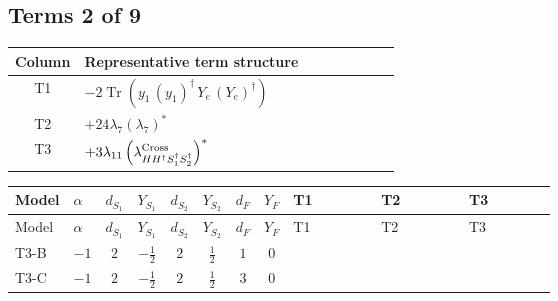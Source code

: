 \documentclass[8pt]{article}
\begin{document}
\begin{landscape}
\subsection*{Terms 2 of 9}
\begin{center}
\begin{tabular}{@{}c >{\raggedright\arraybackslash}p{0.82\linewidth}@{}}
\toprule
Column & Representative term structure \\
\midrule
T1 & \(\displaystyle -2 \operatorname{Tr}\!\left({y_1}\,\left({y_1}\right)^{\dagger}\,{Y_e}\,\left({Y_e}\right)^{\dagger}\right)\) \\
\midrule
T2 & \(\displaystyle +24 {\lambda_{7}} \left({\lambda_{7}}\right)^{*}\) \\
\midrule
T3 & \(\displaystyle +3 {\lambda_{11}} \left({\lambda_{H H^\dagger S_1^\dagger S_2^\dagger}^{\rm Cross}}\right)^{*}\) \\
\midrule
\bottomrule
\end{tabular}
\end{center}
\smallskip
\tiny
\begin{longtable}{@{}llcccccc >{\raggedright\arraybackslash}p{0.21\linewidth} >{\raggedright\arraybackslash}p{0.21\linewidth} >{\raggedright\arraybackslash}p{0.21\linewidth}@{}}
\toprule
Model & $\alpha$ & $d_{S_1}$ & $Y_{S_1}$ & $d_{S_2}$ & $Y_{S_2}$ & $d_F$ & $Y_F$ & T1 & T2 & T3 \\
\midrule
\endfirsthead
\toprule
Model & $\alpha$ & $d_{S_1}$ & $Y_{S_1}$ & $d_{S_2}$ & $Y_{S_2}$ & $d_F$ & $Y_F$ & T1 & T2 & T3 \\
\midrule
\endhead
T3-B & $-1$ & $2$ & $-\frac{1}{2}$ & $2$ & $\frac{1}{2}$ & $1$ & $0$ & \scriptsize\adjustbox{max width=\linewidth}{$\begin{gathered} -2 \operatorname{Tr}\!\left({y_1}\,\left({y_1}\right)^{\dagger}\,{Y_e}\,\left({Y_e}\right)^{\dagger}\right)\end{gathered}$} & \scriptsize\adjustbox{max width=\linewidth}{$\begin{gathered} +24 {\lambda_{7}} \left({\lambda_{7}}\right)^{*}\end{gathered}$} & \scriptsize\adjustbox{max width=\linewidth}{$\begin{gathered} +3 {\lambda_{11}} \left({\lambda_{H H^\dagger S_1^\dagger S_2^\dagger}^{\rm Cross}}\right)^{*}\end{gathered}$} \\
\midrule
T3-C & $-1$ & $2$ & $-\frac{1}{2}$ & $2$ & $\frac{1}{2}$ & $3$ & $0$ & \scriptsize\adjustbox{max width=\linewidth}{$\begin{gathered} -3 \operatorname{Tr}\!\left({y_1}\,\left({y_1}\right)^{\dagger}\,{Y_e}\,\left({Y_e}\right)^{\dagger}\right)\end{gathered}$} & \scriptsize\adjustbox{max width=\linewidth}{$\begin{gathered} +24 {\lambda_{7}} \left({\lambda_{7}}\right)^{*}\end{gathered}$} & \scriptsize\adjustbox{max width=\linewidth}{$\begin{gathered} +3 {\lambda_{11}} \left({\lambda_{H H^\dagger S_1^\dagger S_2^\dagger}^{\rm Cross}}\right)^{*}\end{gathered}$} \\

\end{longtable}
\end{landscape}
\end{document}
